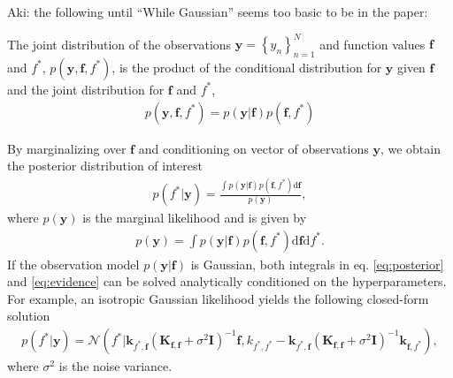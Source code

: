 \documentclass[]{interact}
\theoremstyle{plain}%
\theoremstyle{definition}
\theoremstyle{remark}
\begin{document}
{\color{red} Aki: the following until ``While Gaussian'' seems too basic to be in the paper:}

The joint distribution of the observations $\mathbf{y} = \left\lbrace y_n \right\rbrace_{n=1}^N$ and function values $\mathbf{f}$ and $f^*$, $p(\mathbf{y}, \mathbf{f}, f^*)$, is the product of the conditional distribution for $\mathbf{y}$ given $\mathbf{f}$ and the joint distribution for $\mathbf{f}$ and $f^*$,
\begin{align*}
	p(\mathbf{y}, \mathbf{f}, f^*) = p(\mathbf{y}|\mathbf{f})p(\mathbf{f}, f^*)
\end{align*}
 
By marginalizing over $\mathbf{f}$ and conditioning on vector of observations $\mathbf{y}$, we obtain the posterior distribution of interest
%
\begin{align}\label{eq:posterior}
	p(f^*|\mathbf{y}) = \frac{\int p(\mathbf{y}|\mathbf{f})p(\mathbf{f}, f^*)\text{d}\mathbf{f}}{p(\mathbf{y})},
\end{align}
where $p(\mathbf{y})$ is the marginal likelihood and is given by
\begin{align}\label{eq:evidence}
	p(\textbf{y}) = \int p(\mathbf{y}|\mathbf{f})p(\mathbf{f}, f^*) \text{d}\bm{f}\text{d}f^*.
\end{align}
%
If the observation model $p(\mathbf{y}|\mathbf{f})$ is Gaussian, both integrals in eq. \eqref{eq:posterior} and \eqref{eq:evidence} can be solved analytically conditioned on the hyperparameters. For example, an isotropic Gaussian likelihood yields the following closed-form solution
\begin{align*}
	p(f^*| \mathbf{y}) = \mathcal{N}(f^*| \textbf{k}_{f^*,\mathbf{f}} (\textbf{K}_{\mathbf{f},\mathbf{f}} + \sigma^2 \mathbf{I})^{-1} \mathbf{f},  k_{f^*,f^*}-\mathbf{k}_{f^*,\mathbf{f}} (\mathbf{K}_{\mathbf{f},\mathbf{f}} + \sigma^2 \mathbf{I})^{-1} \mathbf{k}_{\mathbf{f},f^*}  ),
\end{align*}
where $\sigma^2$ is the noise variance.
\end{document}
